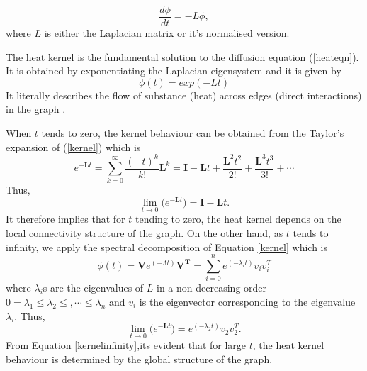 \documentclass[10pt,a4paper]{article}
\begin{document}
        \begin{equation}
        \frac{d \phi}{dt} = -L \phi,
        \label{heateqn}
        \end{equation}
        where $L$ is either the Laplacian matrix or it's normalised version. 
        
        The heat kernel is the fundamental solution to the diffusion equation (\ref{heateqn}). It is obtained by exponentiating the Laplacian eigensystem and it is given by
        \begin{equation}
        \phi(t) = exp(-Lt) 
        \label{kernel}
        \end{equation}
        It literally describes the flow of substance (heat) across edges (direct interactions) in the graph \citep{xiao2009graph}.
       
        When $t$ tends to zero, the kernel behaviour can be obtained from the Taylor's expansion of (\ref{kernel}) which is 
        \begin{equation}
        e^{-\mathbf{L}t} = \sum_{k=0}^{\infty} \frac{(-t)^k}{k!} \mathbf{L}^k = \mathbf{I} -\mathbf{L}t + \frac{\mathbf{L}^2 t^2}{2!} + \frac{\mathbf{L}^3 t^3}{3!}+ \cdots
        \end{equation}
        Thus,
        \begin{equation}
        \lim_{t\longrightarrow 0} \Big(e^{-\mathbf{L}t}\Big) = \mathbf{I} - \mathbf{L}t.
        \label{kerneltozero}
        \end{equation}
        It therefore implies that for $t$ tending to zero, the heat kernel depends on the local connectivity structure of the graph.
        On the other hand, as $t$ tends to infinity, we apply the spectral decomposition of Equation \ref{kernel} which is 
        \begin{equation}
        \phi(t) = \mathbf{V} e^{(-\Lambda t)} \mathbf{V^T} =  \sum_{i=0}^n e^{(-\lambda_i t)} v_i v_i^T 
        \end{equation}
        where $\lambda_i$s are the eigenvalues of $L$ in a non-decreasing order $0=\lambda_1 \leq  \lambda_2 \leq, \cdots \leq \lambda_n$ and $v_i$ is the eigenvector corresponding to the eigenvalue $\lambda_i$. Thus,
        \begin{equation}
        \lim_{t\longrightarrow 0} \Big(e^{-\mathbf{L}t}\Big) = e^{(-\lambda_2 t)} v_2 v_2^T.
        \label{kernelinfinity}  
        \end{equation}
        From Equation \ref{kernelinfinity},its evident that for large $t$, the heat kernel behaviour is determined by the global structure of the graph. 
\end{document}
